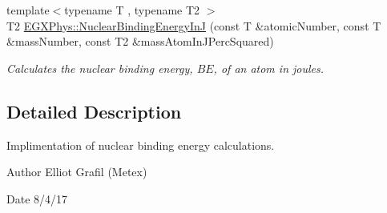\begin{DoxyCompactItemize}
{\footnotesize template$<$typename T , typename T2 $>$ }\\T2 \mbox{\hyperlink{group___e_g_x_phys-_nuclear_binding_energy_gae48a95188d9b71b36d02babf227b9449}{E\+G\+X\+Phys\+::\+Nuclear\+Binding\+Energy\+InJ}} (const T \&atomic\+Number, const T \&mass\+Number, const T2 \&mass\+Atom\+In\+J\+Perc\+Squared)
\begin{DoxyCompactList}\small\item\em Calculates the nuclear binding energy, $BE$, of an atom in joules. \end{DoxyCompactList}\end{DoxyCompactItemize}


\subsection{Detailed Description}
Implimentation of nuclear binding energy calculations. 

\begin{DoxyAuthor}{Author}
Elliot Grafil (Metex) 
\end{DoxyAuthor}
\begin{DoxyDate}{Date}
8/4/17 
\end{DoxyDate}
